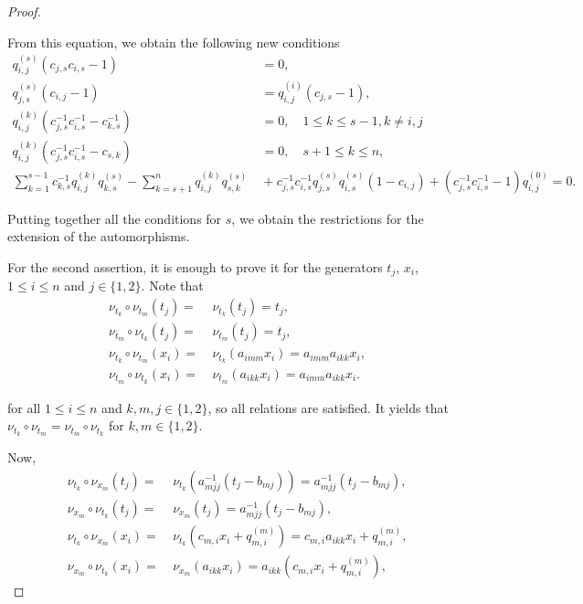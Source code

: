 \documentclass{amsart}
\theoremstyle{definition}
\theoremstyle{remark}
\numberwithin{equation}{section}
\begin{document}
\begin{proof}
\begin{itemize}
\begin{equation*}
    \end{equation*}
    From this equation, we obtain the following new conditions
    \begin{align*}
        q_{i,j}^{(s)}(c_{j,s}c_{i,s}-1) &\ =0, \\
        q_{j,s}^{(s)}(c_{i,j}-1) &\ = q_{i,j}^{(i)}(c_{j,s}-1), \\
        q_{i,j}^{(k)}(c_{j,s}^{-1}c_{i,s}^{-1}-c_{k,s}^{-1}) &\ =0, \quad 1\leq k \leq s-1, k \ne i, j\\
        q_{i,j}^{(k)}(c_{j,s}^{-1}c_{i,s}^{-1}-c_{s,k}) &\ =0, \quad s+1\leq k \leq n,  \\
        \sum_{k=1}^{s-1}c_{k,s}^{-1}q_{i,j}^{(k)}q_{k,s}^{(s)} - \sum_{k=s+1}^{n}q_{i,j}^{(k)}q_{s,k}^{(s)}  &\ + c_{j,s}^{-1}c_{i,s}^{-1}q_{j,s}^{(s)}q_{i,s}^{(s)}(1-c_{i,j})  +(c_{j,s}^{-1}c_{i,s}^{-1}-1)q_{i,j}^{(0)}  = 0.
    \end{align*}
\end{itemize}
Putting together all the conditions for $s$, we obtain the restrictions for the extension of the automorphisms.

For the second assertion, it is enough to prove it for the generators $t_j$, $x_i$, $1\leq i \leq n$ and $j \in \{1, 2\}$. Note that 
\begin{align}
    \nu_{t_k} \circ \nu_{t_m}(t_j) = &\ \nu_{t_k}(t_j)=t_j, \label{comptttj}\\
    \nu_{t_m} \circ \nu_{t_k}(t_j) = &\ \nu_{t_m}(t_j)=t_j, \label{comptttj.} \\
    \nu_{t_k} \circ \nu_{t_m}(x_i) = &\ \nu_{t_k}(a_{imm}x_i)=a_{imm}a_{ikk}x_i, \label{compttxi}\\
    \nu_{t_m} \circ \nu_{t_k}(x_i) = &\ \nu_{t_m}(a_{ikk}x_i)=a_{imm}a_{ikk}x_i. \label{compttxi.}
\end{align}

for all $1\leq i \leq n$ and $k,m,j \in \{1, 2\}$, so all relations are satisfied. It yields that $\nu_{t_k} \circ \nu_{t_m} = \nu_{t_m} \circ \nu_{t_k}$ for $k,m \in \{1, 2\}$.

Now, 
\begin{align}
    \nu_{t_k} \circ \nu_{x_m}(t_j) = &\ \nu_{t_k}(a_{mjj}^{-1}(t_j-b_{mj}))=a_{mjj}^{-1}(t_j-b_{mj}), \label{comptxtj}\\
    \nu_{x_m} \circ \nu_{t_k}(t_j) = &\ \nu_{x_m}(t_j)=a_{mjj}^{-1}(t_j-b_{mj}), \label{comptxtj.} \\
    \nu_{t_k} \circ \nu_{x_m}(x_i) = &\ \nu_{t_k}(c_{m,i}x_i+q_{m,i}^{(m)})=c_{m,i}a_{ikk}x_i+q_{m,i}^{(m)}, \label{comptxxi}\\
    \nu_{x_m} \circ \nu_{t_k}(x_i) = &\ \nu_{x_m}(a_{ikk}x_i)=a_{ikk}(c_{m,i}x_i+q_{m,i}^{(m)}), \label{comptxxi.}
\end{align}


\end{proof}
\end{document}
